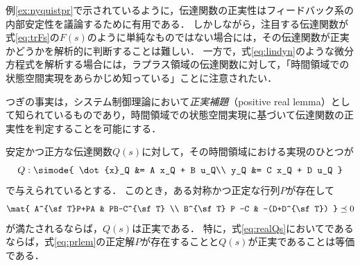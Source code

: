 \documentclass[a4j,10pt,oneside,openany,dvipdfmx]{jsbook}
\begin{document}
例\ref{ex:nyquistpr}で示されているように，伝達関数の正実性はフィードバック系の内部安定性を議論するために有用である．
しかしながら，注目する伝達関数が式\eqref{eq:trFs}の$F(s)$のように単純なものではない場合には，その伝達関数が正実かどうかを解析的に判断することは難しい．
一方で，式\eqref{eq:lindyn}のような微分方程式を解析する場合には，ラプラス領域の伝達関数に対して，「時間領域での状態空間実現をあらかじめ知っている」ことに注意されたい．

つぎの事実は，システム制御理論において\emph{正実補題}（positive real lemma）として知られているものであり\cite{rantzer1996kalman}，時間領域での状態空間実現に基づいて伝達関数の正実性を判定することを可能にする．

\begin{lemma}\label{lem:prlem}
安定かつ正方な伝達関数$Q(s)$に対して，その時間領域における実現のひとつが
\begin{equation}\label{eq:realQs}
Q: \simode{
\dot{x}_Q &= A x_Q + B u_Q\\
y_Q &= C x_Q + D u_Q
}
\end{equation}
で与えられているとする．
このとき，ある対称かつ正定な行列$P$が存在して
\begin{equation}\label{eq:prlem}
\mat{
A^{\sf T}P+PA & PB-C^{\sf T} \\
B^{\sf T} P -C & -(D+D^{\sf T})
}\preceq 0
\end{equation}
が満たされるならば，$Q(s)$は正実である．
特に，式\eqref{eq:realQs}においてであるならば，式\eqref{eq:prlem}の正定解$P$が存在することと$Q(s)$が正実であることは等価である．
\end{lemma}
\end{document}
